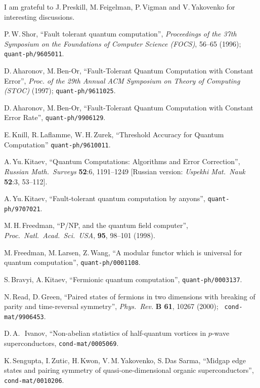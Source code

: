 \bigskip{}  I am grateful to J.\,Preskill,
M.\,Feigelman, P.\,Vigman and V.\,Yakovenko for interesting discussions.


\begin{thebibliography}{99}

 P.\,W.\,Shor,
``Fault tolerant quantum computation'',
{\em Proceedings of the 37th Symposium on the Foundations of Computer
Science (FOCS)}, 56--65 (1996); {\tt quant-ph/9605011}.

 D.\,Aharonov, M.\,Ben-Or,
 ``Fault-Tolerant Quantum Computation with Constant Error'',
{\it Proc. of the 29th Annual ACM Symposium on Theory of Computing (STOC)}
(1997); {\tt quant-ph/9611025}.

 D.\,Aharonov, M.\,Ben-Or,
``Fault-Tolerant Quantum Computation with Constant Error Rate'',
{\tt quant-ph/9906129}.

 E.\,Knill, R.\,Laflamme, W.\,H.\,Zurek,
``Threshold Accuracy for Quantum Computation''
{\tt quant-ph/9610011}.

 A.\,Yu.\,Kitaev,
``Quantum Computations: Algorithms and Error Correction'',
{\it Russian Math.\ Surveys} {\bf 52}:6, 1191--1249
[Russian version: {\it Uspekhi Mat.\ Nauk} {\bf 52}:3, 53--112].

 A.\,Yu.\,Kitaev,
``Fault-tolerant quantum computation by anyons'',
{\tt quant-ph/9707021}.

 M.\,H.\,Freedman,
``P/NP, and the quantum field computer'',
{\it Proc.\ Natl.\ Acad.\ Sci.\ USA}, {\bf 95}, 98--101 (1998).

 M.\,Freedman, M.\,Larsen, Z.\,Wang,
``A modular functor which is universal for quantum computation'',
{\tt quant-ph/0001108}.

 S.\,Bravyi, A.\,Kitaev,
``Fermionic quantum computation'',
{\tt quant-ph/0003137}.

 N.\,Read, D.\,Green,
``Paired states of fermions in two dimensions with breaking of parity and
time-reversal symmetry'', {\it Phys.~Rev.} {\bf B 61}, 10267 (2000); {\tt
cond-mat/9906453}.

 D.\,A.\,~Ivanov,
``Non-abelian statistics of half-quantum vortices in $p$-wave superconductors,
{\tt cond-mat/0005069}.

 K.\,Sengupta, I.\,Zutic, H.\,Kwon, V.\,M.\,Yakovenko, S.\,Das
Sarma,
``Midgap edge states and pairing symmetry of quasi-one-dimensional organic
superconductors'', {\tt cond-mat/0010206}.


\end{thebibliography}



